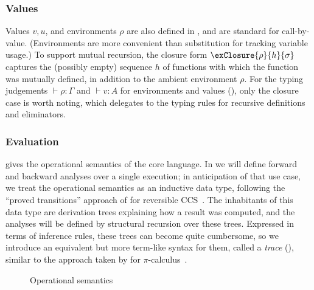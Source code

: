 \subsubsection{Values}
Values $v, u$, and environments $\rho$ are also defined in , and are standard for call-by-value. (Environments are more convenient than substitution for tracking variable usage.) To support mutual recursion, the closure form  $\exClosure{\rho}{h}{\sigma}$ captures the (possibly empty) sequence $h$ of functions with which the function was mutually defined, in addition to the ambient environment $\rho$. For the typing judgements $\vdash \rho: \Gamma$ and $\vdash v: A$ for environments and values (), only the closure case is worth noting, which delegates to the typing rules for recursive definitions and eliminators.

\subsubsection{Evaluation}
\label{sec:core-language:eval}

 gives the operational semantics of the core language. In  we will define forward and backward analyses over a single execution; in anticipation of that use case, we treat the operational semantics as an inductive data type, following the ``proved transitions'' approach of \citeauthor{boudol89} for reversible CCS~\cite{boudol89}. The inhabitants of this data type are derivation trees explaining how a result was computed, and the analyses will be defined by structural recursion over these trees. Expressed in terms of inference rules, these trees can become quite cumbersome, so we introduce an equivalent but more term-like syntax for them, called a \emph{trace} (), similar to the approach taken by \citeauthor{perera16d} for $\pi$-calculus~\cite{perera16d}.



\begin{figure}
   \vspace{1mm}
   
   
   \caption{Operational semantics}
   \label{fig:core-language:semantics}
\end{figure}

